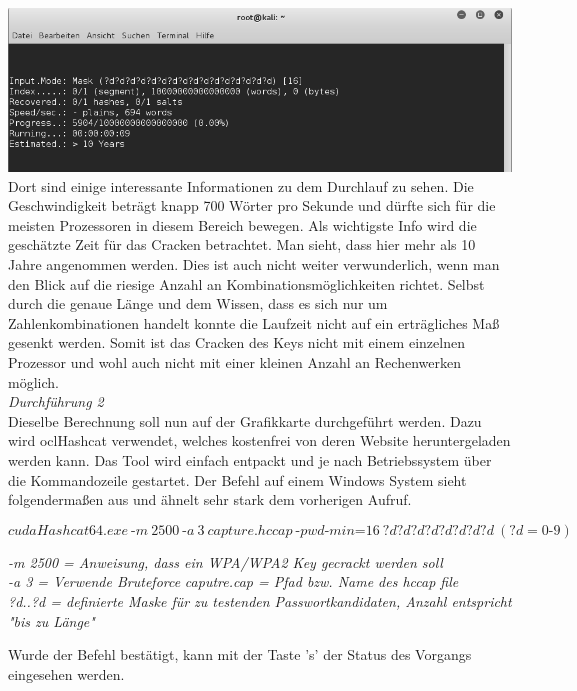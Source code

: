 \includegraphics[width=\textwidth]{bilder/wlan/wlan_screenshot_1.png}\\

Dort sind einige interessante Informationen zu dem Durchlauf zu sehen. Die Geschwindigkeit beträgt knapp 700 Wörter pro Sekunde und dürfte sich für die meisten Prozessoren in diesem Bereich bewegen.
Als wichtigste Info wird die geschätzte Zeit für das Cracken betrachtet. Man sieht, dass hier mehr als 10 Jahre angenommen werden. Dies ist auch nicht weiter verwunderlich, wenn man den Blick auf die riesige Anzahl an Kombinationsmöglichkeiten richtet. Selbst durch die genaue Länge und dem Wissen, dass es sich nur um Zahlenkombinationen handelt konnte die Laufzeit nicht auf ein erträgliches Maß gesenkt werden. Somit ist das Cracken des Keys nicht mit einem einzelnen Prozessor und wohl auch nicht mit einer kleinen Anzahl an Rechenwerken möglich.\\

\textit{Durchführung 2}\\

Dieselbe Berechnung soll nun auf der Grafikkarte durchgeführt werden. Dazu wird oclHashcat verwendet, welches kostenfrei von deren Website heruntergeladen werden kann. Das Tool wird einfach entpackt und je nach Betriebssystem über die Kommandozeile gestartet. Der Befehl auf einem Windows System sieht folgendermaßen aus und ähnelt sehr stark dem vorherigen Aufruf.

$$cudaHashcat64.exe~\text{-}m~2500~\text{-}a~3~capture.hccap~\text{-}pwd\text{-}min\text{=}16~?d?d?d?d?d?d?d?d~(?d = 0\text{-}9)$$

\textit{-m 2500 = Anweisung, dass ein WPA/WPA2 Key gecrackt werden soll}\\
\textit{-a 3 = Verwende Bruteforce}
\textit{caputre.cap = Pfad bzw. Name des hccap file}\\
\textit{?d..?d = definierte Maske für zu testenden Passwortkandidaten, Anzahl entspricht "bis zu Länge"\\}

Wurde der Befehl bestätigt, kann mit der Taste 's' der Status des Vorgangs eingesehen werden.

